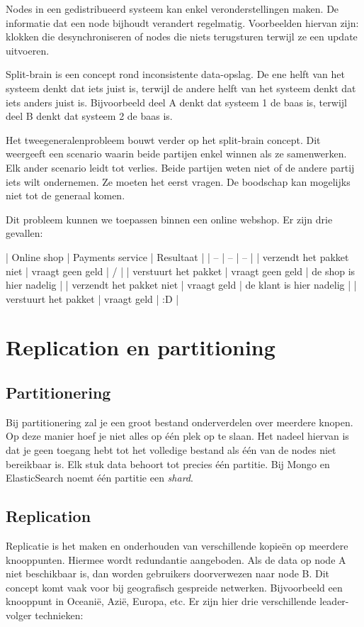 \documentclass[a4paper,10pt,twoside]{report}
\begin{document}
Nodes in een gedistribueerd systeem kan enkel veronderstellingen maken. De informatie dat een node bijhoudt verandert regelmatig. Voorbeelden hiervan zijn: klokken die desynchroniseren of nodes die niets terugsturen terwijl ze een update uitvoeren.

Split-brain is een concept rond inconsistente data-opslag. De ene helft van het systeem denkt dat iets juist is, terwijl de andere helft van het systeem denkt dat iets anders juist is. Bijvoorbeeld deel A denkt dat systeem 1 de baas is, terwijl deel B denkt dat systeem 2 de baas is.

Het tweegeneralenprobleem bouwt verder op het split-brain concept. Dit weergeeft een scenario waarin beide partijen enkel winnen als ze samenwerken. Elk ander scenario leidt tot verlies. Beide partijen weten niet of de andere partij iets wilt ondernemen. Ze moeten het eerst vragen. De boodschap kan mogelijks niet tot de generaal komen.

Dit probleem kunnen we toepassen binnen een online webshop. Er zijn drie gevallen:

| Online shop | Payments service | Resultaat |
| -- | -- | -- |
| verzendt het pakket niet | vraagt geen geld | / |
| verstuurt het pakket | vraagt geen geld | de shop is hier nadelig |
| verzendt het pakket niet | vraagt geld | de klant is hier nadelig |
| verstuurt het pakket | vraagt geld | :D |

\section{Replication en partitioning}

\subsection{Partitionering}

Bij partitionering zal je een groot bestand onderverdelen over meerdere knopen. Op deze manier hoef je niet alles op één plek op te slaan. Het nadeel hiervan is dat je geen toegang hebt tot het volledige bestand als één van de nodes niet bereikbaar is. Elk stuk data behoort tot precies één partitie. Bij Mongo en ElasticSearch noemt één partitie een \textit{shard}.

\subsection{Replication}

Replicatie is het maken en onderhouden van verschillende kopieën op meerdere knooppunten. Hiermee wordt redundantie aangeboden. Als de data op node A niet beschikbaar is, dan worden gebruikers doorverwezen naar node B. Dit concept komt vaak voor bij geografisch gespreide netwerken. Bijvoorbeeld een knooppunt in Oceanië, Azië, Europa, etc. Er zijn hier drie verschillende leader-volger technieken: 
\end{document}
